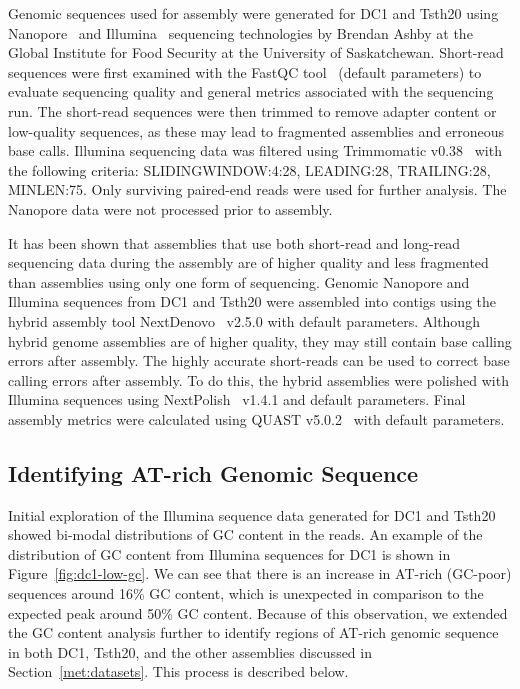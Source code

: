 Genomic sequences used for assembly were generated for DC1 and Tsth20 using Nanopore~\cite{wang2021a} and Illumina~\cite{bennett2004a} sequencing technologies by Brendan Ashby at the Global Institute for Food Security at the University of Saskatchewan. Short-read sequences were first examined with the FastQC tool~\cite{andrews} (default parameters) to evaluate sequencing quality and general metrics associated with the sequencing run. The short-read sequences were then trimmed to remove adapter content or low-quality sequences, as these may lead to fragmented assemblies and erroneous base calls. Illumina sequencing data was filtered using Trimmomatic v0.38~\cite{bolger2014a} with the following criteria: SLIDINGWINDOW:4:28, LEADING:28, TRAILING:28, MINLEN:75. Only surviving paired-end reads were used for further analysis. The Nanopore data were not processed prior to assembly.

It has been shown that assemblies that use both short-read and long-read sequencing data during the assembly are of higher quality and less fragmented than assemblies using only one form of sequencing. Genomic Nanopore and Illumina sequences from DC1 and Tsth20 were assembled into contigs using the hybrid assembly tool NextDenovo~\cite{hu2024a} v2.5.0 with default parameters. Although hybrid genome assemblies are of higher quality, they may still contain base calling errors after assembly. The highly accurate short-reads can be used to correct base calling errors after assembly. To do this, the hybrid assemblies were polished with Illumina sequences using NextPolish~\cite{hu2020a} v1.4.1 and default parameters. Final assembly metrics were calculated using QUAST v5.0.2~\cite{gurevich2013a} with default parameters.

\subsection{Identifying AT-rich Genomic Sequence}\label{met:atrich}

Initial exploration of the Illumina sequence data generated for DC1
and Tsth20 showed bi-modal distributions of GC content in the
reads. An example of the distribution of GC content from Illumina sequences for DC1 is shown in Figure~\ref{fig:dc1-low-gc}. We can see that there is an increase in AT-rich (GC-poor) sequences around 16\% GC content, which is unexpected in comparison to the expected peak around 50\% GC content. Because of this observation, we extended the GC content analysis further to identify
 regions of AT-rich genomic sequence in both DC1, Tsth20, and the other assemblies discussed in Section~\ref{met:datasets}. This process is described below.
 
